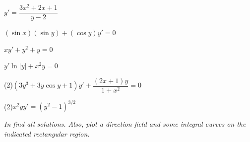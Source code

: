 \begin{exerciselistTwoColumn}
\item\label{exer:2.2.1}$y'=\dfrac{3x^2+2x+1}{y-2}$
\item\label{exer:2.2.2}$(\sin x)(\sin y)+(\cos y)y'=0$
\item\label{exer:2.2.3}$xy'+y^2+y=0$
\item\label{exer:2.2.4}$y' \ln |y|+x^2y= 0$
\item(2)\label{exer:2.2.5}$(3y^3+3y \cos y+1)y'+\dfrac{(2x+1)y}{1+x^2}=0$
\item(2)\label{exer:2.2.6}$x^2yy'=(y^2-1)^{3/2}$
\end{exerciselistTwoColumn}
%
\textsl{In  find all
solutions. Also, plot a direction field and some integral curves on
the indicated rectangular region.}

